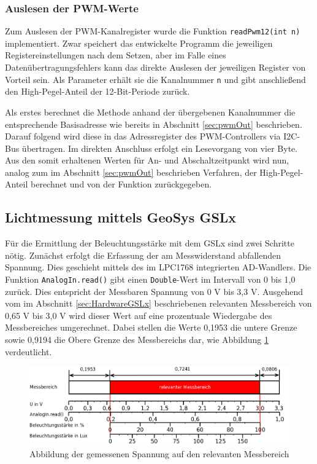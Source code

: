 \documentclass[a4paper,12pt]{scrartcl}
\begin{document}
\subsubsection{Auslesen der PWM-Werte}
Zum Auslesen der PWM-Kanalregister wurde die Funktion \texttt{readPwm12(int n)} implementiert. Zwar speichert das entwickelte Programm die jeweiligen Registereinstellungen nach dem Setzen, aber im Falle eines Datenübertragungsfehlers kann das direkte Auslesen der jeweiligen Register von Vorteil sein. Als Parameter erhält sie die Kanalnummer \texttt{n} und gibt anschließend den High-Pegel-Anteil der 12-Bit-Periode zurück.

Als erstes berechnet die Methode anhand der übergebenen Kanalnummer die entsprechende Basisadresse wie bereits in Abschnitt \ref{sec:pwmOut} beschrieben. Darauf folgend wird diese in das Adressregister des PWM-Controllers via I2C-Bus übertragen. Im direkten Anschluss erfolgt ein Lesevorgang von vier Byte. Aus den somit erhaltenen Werten für An- und Abschaltzeitpunkt wird nun, analog zum im Abschnitt \ref{sec:pwmOut} beschrieben Verfahren, der High-Pegel-Anteil berechnet und von der Funktion zurückgegeben.

\subsection{Lichtmessung mittels GeoSys GSLx}
\label{sec:impGSLx}
Für die Ermittlung der Beleuchtungsstärke mit dem GSLx sind zwei Schritte nötig. Zunächst erfolgt die Erfassung der am Messwiderstand abfallenden Spannung. Dies geschieht mittels des im LPC1768 integrierten AD-Wandlers. Die Funktion \texttt{AnalogIn.read()} gibt einen \texttt{Double}-Wert im Intervall von 0 bis 1,0 zurück. Dies entspricht der Messbaren Spannung von 0 V bis 3,3 V. Ausgehend vom im Abschnitt \ref{sec:HardwareGSLx} beschriebenen relevanten Messbereich von 0,65 V bis 3,0 V wird dieser Wert auf eine prozentuale Wiedergabe des Messbereiches umgerechnet. Dabei stellen die Werte 0,1953 die untere Grenze sowie 0,9194 die Obere Grenze des Messbereichs dar, wie Abbildung \ref{fig:geosysScale} verdeutlicht.

\begin{figure}[H]
\begin{center}
\includegraphics[width=0.9\hsize]{./schematics/geosysScale.png}
\end{center}
\caption{\label{fig:geosysScale}Abbildung der gemessenen Spannung auf den relevanten Messbereich}
\end{figure}
\end{document}
